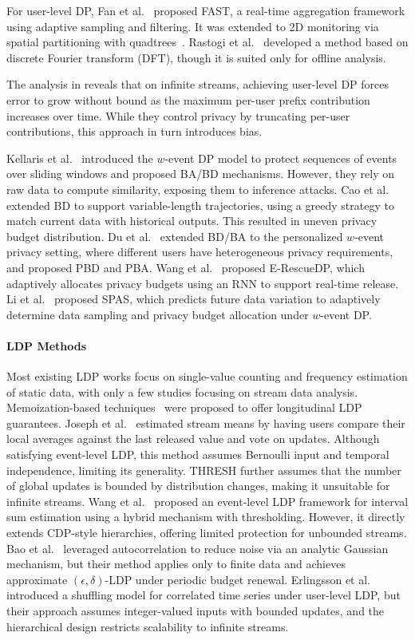 \documentclass[acmsmall]{acmart}
\begin{document}
For user-level DP, Fan et al.~\cite{Fan2013a} proposed FAST, a real-time
aggregation framework using adaptive sampling and filtering.
It was extended to 2D monitoring via spatial partitioning with
quadtrees~\cite{Fan2013}.
Rastogi et al.~\cite{Rastogi2010} developed a method based on discrete Fourier
transform (DFT), though it is suited only for offline analysis. {The analysis in \cite{2023userdp} reveals that on infinite streams, achieving user-level DP forces error to grow without bound as the maximum per-user prefix contribution increases over time. While they control privacy by truncating per-user contributions, this approach in turn introduces bias.

Kellaris et al.~\cite{Kellaris2014} introduced the $w$-event DP model to protect
sequences of events over sliding windows and proposed BA/BD mechanisms.
However, they rely on raw data to compute similarity, exposing them to inference
attacks.
Cao et al.~\cite{Cao2015} extended BD to support variable-length trajectories,
using a greedy strategy to match current data with historical outputs.
This resulted in uneven privacy budget distribution.
Du et al.~\cite{du2025} extended BD/BA to the personalized $w$-event privacy setting, where different users have heterogeneous privacy requirements, and proposed PBD and PBA.
Wang et al.~\cite{Wang2019} proposed E-RescueDP, which adaptively allocates
privacy budgets using an RNN to support real-time release.
Li et al.~\cite{Li2025} proposed SPAS, which predicts future data variation to
adaptively determine data sampling and privacy budget allocation under $w$-event
DP.

\paragraph{LDP Methods}
Most existing LDP works focus on single-value counting and frequency estimation
of static data, with only a few studies focusing on stream data analysis.
Memoization-based techniques~\cite{Ding2017, Erlingsson2014, Arcolezi2021} were
proposed to offer longitudinal LDP guarantees.
Joseph et al.~\cite{Joseph2018} estimated stream means by having users compare
their local averages against the last released value and vote on updates.
Although satisfying event-level LDP, this method assumes Bernoulli input and
temporal independence, limiting its generality.
THRESH further assumes that the number of global updates is bounded by
distribution changes, making it unsuitable for infinite streams.
Wang et al.~\cite{Wang2021} proposed an event-level LDP framework for interval
sum estimation using a hybrid mechanism with thresholding.
However, it directly extends CDP-style hierarchies, offering limited protection
for unbounded streams.
Bao et al.~\cite{Bao2021} leveraged autocorrelation to reduce noise via an
analytic Gaussian mechanism, but their method applies only to finite data and
achieves approximate $(\epsilon, \delta)$-LDP under periodic budget renewal.
Erlingsson et al.~\cite{Erlingsson2019} introduced a shuffling model for
correlated time series under user-level LDP, but their approach assumes
integer-valued inputs with bounded updates, and the hierarchical design
restricts scalability to infinite streams.

}
\end{document}

